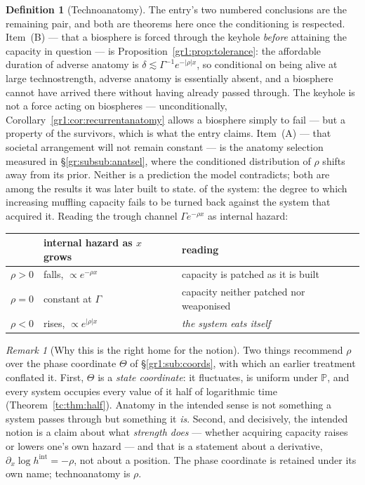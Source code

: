 \documentclass[11pt]{article}
\numberwithin{equation}{section}
\theoremstyle{plain}
\theoremstyle{definition}
\newtheorem{definition}[theorem]{Definition}
\theoremstyle{remark}
\newtheorem{remark}[theorem]{Remark}
\newcommand{\PP}{\mathbb{P}}
\begin{document}
\begin{definition}[Technoanatomy]
{The entry's two numbered conclusions are the remaining pair, and both
are theorems here once the conditioning is respected. Item~(B) --- that
a biosphere is forced through the keyhole \emph{before} attaining the
capacity in question --- is
Proposition~\ref{gr1:prop:tolerance}: the affordable duration of adverse
anatomy is $\delta\lesssim\Gamma^{-1}e^{-|\rho|x}$, so conditional on
being alive at large technostrength, adverse anatomy is essentially
absent, and a biosphere cannot have arrived there without having already
passed through. The keyhole is not a force acting on biospheres --- 
unconditionally, Corollary~\ref{gr1:cor:recurrentanatomy} allows a
biosphere simply to fail --- but a property of the survivors, which is
what the entry claims. Item~(A) --- that societal arrangement will not
remain constant --- is the anatomy selection measured in
\S\ref{gr:subsub:anatsel}, where the conditioned distribution of $\rho$
shifts away from its prior. Neither is a prediction the model
contradicts; both are among the results it was later built to state.}
of the system: the
degree to which increasing muffling capacity fails to be turned back
against the system that acquired it. Reading the trough channel
$\Gamma e^{-\rho x}$ as internal hazard:
\begin{center}\small
\begin{tabular}{@{}lll@{}}
\toprule
& internal hazard as $x$ grows & reading\\
\midrule
$\rho>0$ & falls, $\propto e^{-\rho x}$ & capacity is patched as it is
built\\
$\rho=0$ & constant at $\Gamma$ & capacity neither patched nor
weaponised\\
$\rho<0$ & rises, $\propto e^{|\rho|x}$ & \emph{the system eats itself}\\
\bottomrule
\end{tabular}
\end{center}
\end{definition}

\begin{remark}[Why this is the right home for the notion]
\label{gr1:rem:anatomyhome}
Two things recommend $\rho$ over the phase coordinate $\Theta$ of
\S\ref{gr1:sub:coords}, with which an earlier treatment conflated it.
First, $\Theta$ is a \emph{state coordinate}: it fluctuates, is uniform
under $\PP$, and every system occupies every value of it half of
logarithmic time (Theorem~\ref{tc:thm:half}). Anatomy in the intended
sense is not something a system passes through but something it
\emph{is}. Second, and decisively, the intended notion is a claim about
what \emph{strength does} --- whether acquiring capacity raises or
lowers one's own hazard --- and that is a statement about a derivative,
$\partial_x\log h^{\mathrm{int}} = -\rho$, not about a position. The
phase coordinate is retained under its own name; technoanatomy is
$\rho$.
\end{remark}
\end{document}
